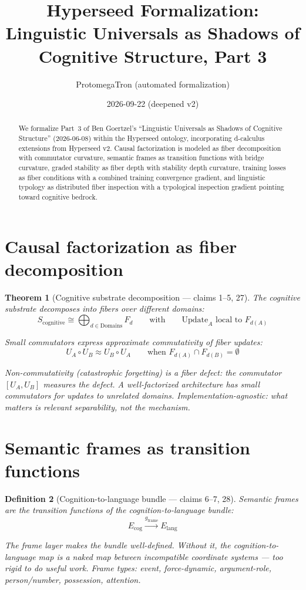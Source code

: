 \documentclass[11pt,a4paper]{article}
\title{Hyperseed Formalization:\\
  Linguistic Universals as Shadows of Cognitive Structure, Part 3}
\author{ProtomegaTron (automated formalization)}
\date{2026-09-22 (deepened v2)}
\newtheorem{definition}{Definition}[section]
\newtheorem{theorem}[definition]{Theorem}
\begin{document}
\maketitle

\begin{abstract}
We formalize Part~3 of Ben Goertzel's ``Linguistic Universals as Shadows
of Cognitive Structure'' (2026-06-08) within the Hyperseed ontology,
incorporating d-calculus extensions from Hyperseed v2. Causal factorization
is modeled as fiber decomposition with commutator curvature, semantic
frames as transition functions with bridge curvature, graded stability as
fiber depth with stability depth curvature, training losses as fiber
conditions with a combined training convergence gradient, and linguistic
typology as distributed fiber inspection with a typological inspection
gradient pointing toward cognitive bedrock.
\end{abstract}

\tableofcontents

\section{Causal factorization as fiber decomposition}

\begin{theorem}[Cognitive substrate decomposition --- claims 1--5, 27]
\label{thm:factorization}
The cognitive substrate decomposes into fibers over different domains:
\[
  S_{\text{cognitive}} \cong \bigoplus_{d \in \text{Domains}} F_d
  \qquad \text{with} \qquad
  \text{Update}_A \text{ local to } F_{d(A)}
\]

Small commutators express approximate commutativity of fiber updates:
\[
  U_A \circ U_B \approx U_B \circ U_A
  \qquad \text{when } F_{d(A)} \cap F_{d(B)} = \emptyset
\]

Non-commutativity (catastrophic forgetting) is a fiber defect: the
commutator $[U_A, U_B]$ measures the defect. A well-factorized
architecture has small commutators for updates to unrelated domains.
Implementation-agnostic: what matters is relevant separability, not
the mechanism.
\end{theorem}

\section{Semantic frames as transition functions}

\begin{definition}[Cognition-to-language bundle --- claims 6--7, 28]
\label{def:frames}
Semantic frames are the transition functions of the cognition-to-language
bundle:
\[
  E_{\text{cog}} \xrightarrow{g_{\text{frame}}} E_{\text{lang}}
\]

The frame layer makes the bundle well-defined. Without it, the
cognition-to-language map is a naked map between incompatible coordinate
systems --- too rigid to do useful work. Frame types: event, force-dynamic,
argument-role, person/number, possession, attention.
\end{definition}
\end{document}
